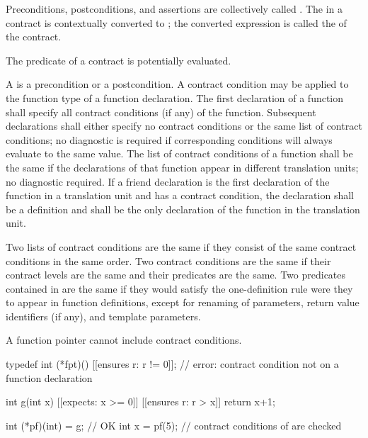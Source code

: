 \pnum
Preconditions, postconditions, and assertions
are collectively called .
The  in a contract
is contextually converted to ;
the converted expression is called
the  of the contract.
\begin{note}
The predicate of a contract is potentially evaluated.
\end{note}

\pnum
A  is a precondition or a postcondition.
A contract condition may be applied to
the function type of a function declaration.
The first declaration of a function shall specify
all contract conditions (if any) of the function.
Subsequent declarations shall either specify no contract conditions
or the same list of contract conditions;
no diagnostic is required
if corresponding conditions will always evaluate to the same value.
The list of contract conditions of a function shall be the same
if the declarations of that function appear in different translation units;
no diagnostic required.
If a friend declaration
is the first declaration of the function in a translation unit
and has a contract condition,
the declaration shall be a definition and
shall be the only declaration of the function in the translation unit.

\pnum
Two lists of contract conditions are the same
if they consist of the same contract conditions in the same order.
Two contract conditions are the same
if their contract levels are the same and their predicates are the same.
Two predicates contained in 
are the same
if they would satisfy the one-definition rule
were they to appear in function definitions,
except for renaming of parameters,
return value identifiers (if any),
and template parameters.

\pnum
\begin{note}
A function pointer cannot include contract conditions.
\begin{example}
\begin{codeblock}
typedef int (*fpt)() [[ensures r: r != 0]];     // error: contract condition not on a function declaration

int g(int x) 
  [[expects: x >= 0]] 
  [[ensures r: r > x]]
{
  return x+1;
}

int (*pf)(int) = g;                             // OK
int x = pf(5);                                  // contract conditions of  are checked
\end{codeblock}
\end{example}
\end{note}

